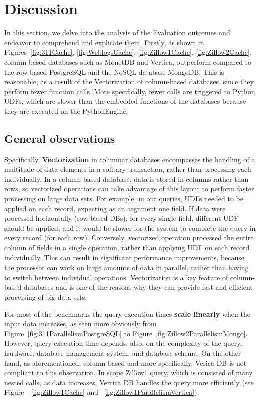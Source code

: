 \section{Discussion}
\label{sec:discussion}

In this section, we delve into the analysis of the Evaluation outcomes and endeavor to comprehend and explicate them. Firstly, as shown in Figures~\ref{fig:311Cache}, \ref{fig:WeblogsCache},
\ref{fig:Zillow1Cache}, \ref{fig:Zillow2Cache}, column-based databases such as MonetDB and 
Vertica, outperform compared to the row-based PostgreSQL and the NoSQL 
database MongoDB. This is reasonable, as a result of the Vectorization of column-based 
databases, since they perform fewer function calls. More specifically, fewer calls are triggered 
to Python UDFs, which are slower than the embedded functions of the databases because they 
are executed on the PythonEngine.

\subsection{General observations}
Specifically, \textbf{Vectorization} in columnar databases encompasses the handling of a 
multitude of data elements in a solitary transaction, rather than processing each individually.
In a column-based database, data is stored in columns rather than rows, so vectorized 
operations can take advantage of this layout to perform faster processing on large data 
sets. For example, in our queries, UDFs needed to be applied on each record, 
expecting as an argument one field. If data were processed horizontally (row-based DBs), 
for every single field, different UDF should be applied, and it would be slower for the system
to complete the query in every record (for each row). Conversely, vectorized operation 
processed the entire column of fields in a single operation, rather than applying UDF on each 
record individually. 
This can result in significant performance improvements, because the 
processor can work on large amounts of data in parallel, rather than having to switch between 
individual operations. Vectorization is a key feature of column-based databases and is one of 
the reasons why they can provide fast and efficient processing of big data sets.

For most of the benchmarks the query execution times \textbf{scale linearly} when the input data increases, as seen
more obviously from Figure~\ref{fig:311ParallelismPostgreSQL} to Figure~\ref{fig:Zillow2ParallelismMongo}.
However, query execution time depends, also, on the complexity of the 
query, hardware, database management system, and database schema. 
On the other hand, as aforementioned, column-based and more specifically, Verica DB 
is not compliant to this observation. In scope Zillow1 query, which is consisted
of many nested calls, as data increases, Vertica DB handles the query more efficiently 
(see Figure~~\ref{fig:Zillow1Cache} and ~\ref{fig:Zillow1ParallelismVertica}). 

